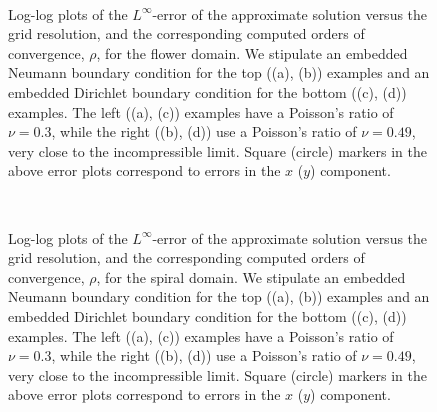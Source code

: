 \setlength{\figurewidth}{0.49\textwidth}
\begin{figure}[htbp]
\centering
{}
 \\
\caption{Log-log plots of the $L^{\infty}$-error of the approximate solution versus the grid resolution, and the corresponding computed orders of convergence, $\rho$, for the flower domain. We stipulate an embedded Neumann boundary condition for the top ((a), (b)) examples and an embedded Dirichlet boundary condition for the bottom ((c), (d)) examples. The left ((a), (c)) examples have a Poisson's ratio of $\nu = 0.3$, while the right ((b), (d)) use a Poisson's ratio of $\nu = 0.49$, very close to the incompressible limit. Square (circle) markers in the above error plots correspond to errors in the $x$ ($y$) component.}
\label{fig:chap5.examples.convergence.flower}
\end{figure}

\setlength{\figurewidth}{0.49\textwidth}
\begin{figure}[htbp]
\centering
{}
 \\
\caption{Log-log plots of the $L^{\infty}$-error of the approximate solution versus the grid resolution, and the corresponding computed orders of convergence, $\rho$, for the spiral domain. We stipulate an embedded Neumann boundary condition for the top ((a), (b)) examples and an embedded Dirichlet boundary condition for the bottom ((c), (d)) examples. The left ((a), (c)) examples have a Poisson's ratio of $\nu = 0.3$, while the right ((b), (d)) use a Poisson's ratio of $\nu = 0.49$, very close to the incompressible limit. Square (circle) markers in the above error plots correspond to errors in the $x$ ($y$) component.}
\label{fig:chap5.examples.convergence.spiral}
\end{figure}

